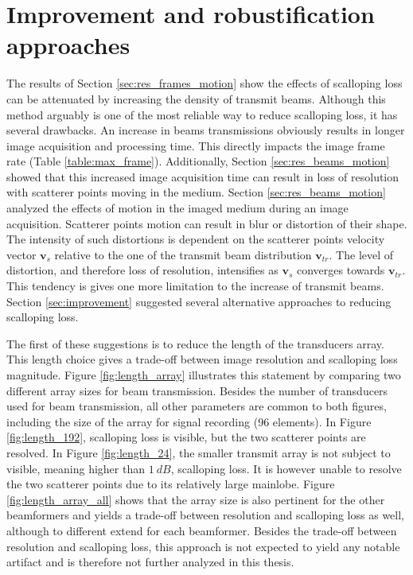 \section{Improvement and robustification approaches}
\label{sec:res_improvement}
The results of Section \ref{sec:res_frames_motion} show the effects of scalloping loss can be attenuated by increasing the density of transmit beams. Although this method arguably is one of the most reliable way to reduce scalloping loss, it has several drawbacks. An increase in beams transmissions obviously results in longer image acquisition and processing time. This directly impacts the image frame rate (Table \ref{table:max_frame}). Additionally, Section \ref{sec:res_beams_motion} showed that this increased image acquisition time can result in loss of resolution with scatterer points moving in the medium.
Section \ref{sec:res_beams_motion} analyzed the effects of motion in the imaged medium during an image acquisition. Scatterer points motion can result in blur or distortion of their shape. The intensity of such distortions is dependent on the scatterer points velocity vector $\boldsymbol{v}_s$ relative to the one of the transmit beam distribution $\boldsymbol{v}_{tr}$.
The level of distortion, and therefore loss of resolution, intensifies as $\boldsymbol{v}_s$ converges towards $\boldsymbol{v}_{tr}$. This tendency is gives one more limitation to the increase of transmit beams.
Section \ref{sec:improvement} suggested several alternative approaches to reducing scalloping loss.

The first of these suggestions is to reduce the length of the transducers array. This length choice gives a trade-off between image resolution and scalloping loss magnitude. Figure \ref{fig:length_array} illustrates this statement by comparing two different array sizes for beam transmission. Besides the number of transducers used for beam transmission, all other parameters are common to both figures, including the size of the array for signal recording (96 elements).
In Figure \ref{fig:length_192}, scalloping loss is visible, but the two scatterer points are resolved. In Figure \ref{fig:length_24}, the smaller transmit array is not subject to visible, meaning higher than $1~dB$, scalloping loss. It is however unable to resolve the two scatterer points due to its relatively large mainlobe. Figure \ref{fig:length_array_all} shows that the array size is also pertinent for the other beamformers and yields a trade-off between resolution and scalloping loss as well, although to different extend for each beamformer.
Besides the trade-off between resolution and scalloping loss, this approach is not expected to yield any notable artifact and is therefore not further analyzed in this thesis.

